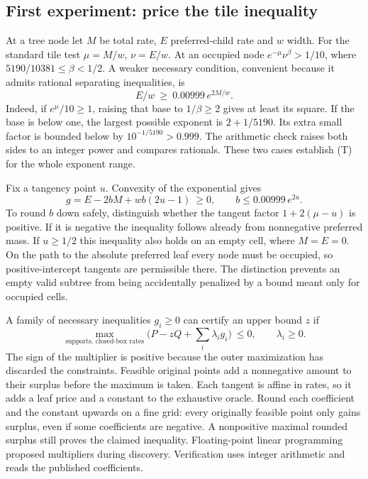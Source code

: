 \documentclass[12pt,letterpaper]{article}
\begin{document}
\subsection{First experiment: price the tile inequality}
At a tree node let \(M\) be total rate, \(E\) preferred-child rate and \(w\) width. For the standard tile test \(\mu=M/w\), \(\nu=E/w\). At an occupied node \(e^{-\mu}\nu^\beta>1/10\), where \(5190/10381\le\beta<1/2\). A weaker necessary condition, convenient because it admits rational separating inequalities, is
\[
  E/w \ \ge\ 0.00999\,e^{2M/w}.                       \tag{T}
\]
Indeed, if \(e^\mu/10\ge1\), raising that base to \(1/\beta\ge2\) gives at least its square. If the base is below one, the largest possible exponent is \(2+1/5190\). Its extra small factor is bounded below by \(10^{-1/5190}>0.999\). The arithmetic check raises both sides to an integer power and compares rationals. These two cases establish (T) for the whole exponent range.

Fix a tangency point \(u\). Convexity of the exponential gives
\[
 g=E-2bM+w b(2u-1)\ \ge0,\qquad
    b\le0.00999\,e^{2u}.
\]
To round \(b\) down safely, distinguish whether the tangent factor \(1+2(\mu-u)\) is positive. If it is negative the inequality follows already from nonnegative preferred mass. If \(u\ge1/2\) this inequality also holds on an empty cell, where \(M=E=0\). On the path to the absolute preferred leaf every node must be occupied, so positive-intercept tangents are permissible there. The distinction prevents an empty valid subtree from being accidentally penalized by a bound meant only for occupied cells.

A family of necessary inequalities \(g_i\ge0\) can certify an upper bound \(z\) if
\[
 \max_{\text{supports, closed-box rates}}
       \bigl(P-zQ+\sum_i\lambda_i g_i\bigr)\ \le0,\qquad \lambda_i\ge0 .
\]
The sign of the multiplier is positive because the outer maximization has discarded the constraints. Feasible original points add a nonnegative amount to their surplus before the maximum is taken. Each tangent is affine in rates, so it adds a leaf price and a constant to the exhaustive oracle. Round each coefficient and the constant upwards on a fine grid: every originally feasible point only gains surplus, even if some coefficients are negative. A nonpositive maximal rounded surplus still proves the claimed inequality. Floating-point linear programming proposed multipliers during discovery. Verification uses integer arithmetic and reads the published coefficients.
\end{document}
